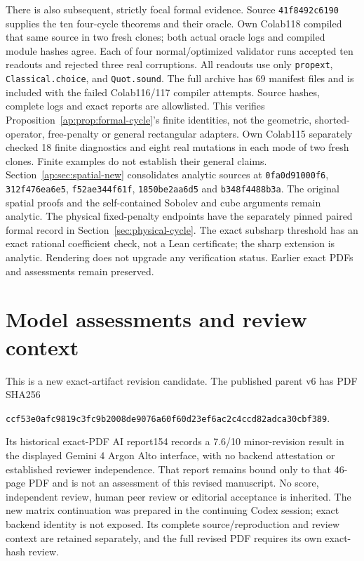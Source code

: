 \documentclass[11pt]{article}
\begin{document}
There is also subsequent, strictly focal formal evidence. Source
\texttt{41f8492c6190} supplies the ten four-cycle theorems and their oracle.
Own Colab118 compiled that same source in two fresh clones; both actual oracle logs
and compiled module hashes agree. Each of four normal/optimized validator runs
accepted ten readouts and rejected three real corruptions. All readouts use only
\texttt{propext}, \texttt{Classical.choice}, and \texttt{Quot.sound}.
The full archive has 69 manifest files and is included with the failed Colab116/117
compiler attempts. Source hashes, complete logs and exact reports are allowlisted.
This verifies Proposition~\ref{ap:prop:formal-cycle}'s finite identities, not the
geometric, shorted-operator, free-penalty or general rectangular adapters.
Own Colab115 separately checked 18 finite diagnostics and eight real mutations in
each mode of two fresh clones. Finite examples do not establish their general claims.
Section~\ref{ap:sec:spatial-new} consolidates analytic sources at
\texttt{0fa0d91000f6}, \texttt{312f476ea6e5}, \texttt{f52ae344f61f},
\texttt{1850be2aa6d5} and \texttt{b348f4488b3a}. The original spatial proofs and the self-contained Sobolev and cube
arguments remain analytic. The physical fixed-penalty endpoints have the
separately pinned paired formal record in Section~\ref{sec:physical-cycle}.
The exact subsharp threshold has an exact rational coefficient check, not a
Lean certificate; the sharp extension is analytic. Rendering does not upgrade
any verification status. Earlier exact PDFs and assessments remain preserved.

\section{Model assessments and review context}\label{sec:model-context}
This is a new exact-artifact revision candidate. The published parent v6
has PDF SHA256
\begin{center}\scriptsize\texttt{ccf53e0afc9819c3fc9b2008de9076a60f60d23ef6ac2c4ccd82adca30cbf389}.\end{center}
Its historical exact-PDF AI report154 records a 7.6/10 minor-revision result
in the displayed Gemini 4 Argon Alto interface, with no backend attestation
or established reviewer independence. That report remains bound only to
that 46-page PDF and is not an assessment of this revised manuscript.
No score, independent review, human peer review or editorial acceptance
is inherited. The new matrix continuation was prepared in the continuing
Codex session; exact backend identity is not exposed. Its complete
source/reproduction and review context are retained separately, and the
full revised PDF requires its own exact-hash review.
\end{document}
